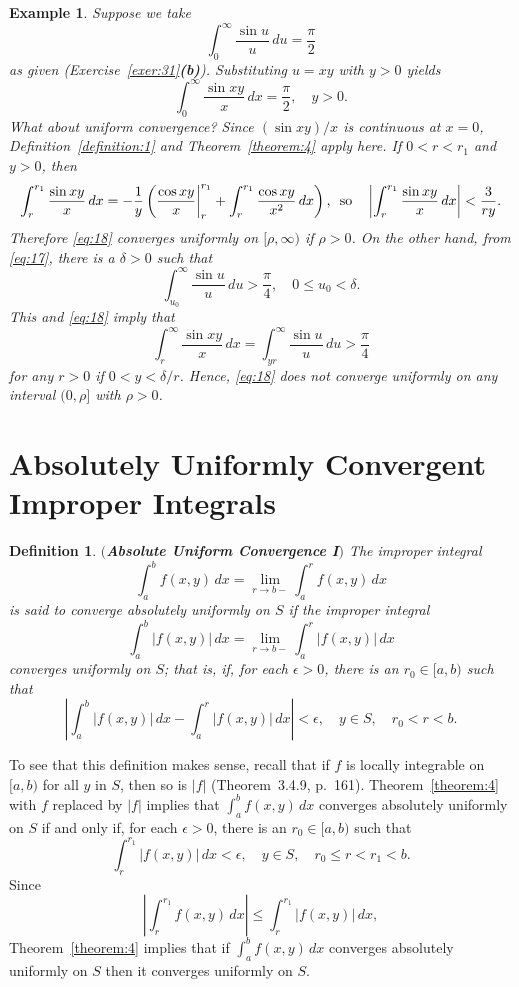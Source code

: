 \documentclass{article}
\newtheorem{definition}{Definition}
\newtheorem{example}{Example}
\begin{document}
\begin{example}  \label{example:6}  \rm
Suppose we take
\begin{equation} \label{eq:17}
\int_{0}^{\infty}\frac{\sin u}{u}\,du =\frac{\pi}{2}
\end{equation}
as given (Exercise~\ref{exer:31}{\bf(b)}).  Substituting $u=xy$ with $y>0$
yields
\begin{equation} \label{eq:18}
\int_{0}^{\infty}\frac{\sin xy}{x}\,dx=\frac{\pi}{2},\quad y>0.
\end{equation}
What about uniform convergence?
Since $(\sin xy)/x$ is continuous at $x=0$, Definition~\ref{definition:1}
and Theorem~\ref{theorem:4} apply here.
If $0<r<r_{1}$ and $y>0$, then
$$
\int_{r}^{r_{1}}\frac{\sin xy}{x}\,dx=-\frac{1}{y}
\left(\frac{\cos xy}{x}\biggr|_{r}^{r_{1}}+
\int_{r}^{r_{1}}\frac{\cos xy}{x^{2}}\,dx\right),
\text{\, so\quad}
\left|\int_{r}^{r_{1}}\frac{\sin xy}{x}\,dx\right|<\frac{3}{ry}.
$$
Therefore \eqref{eq:18} converges uniformly on
$[\rho,\infty)$ if $\rho>0$. On the other hand, from \eqref{eq:17},
there is a $\delta>0$  such that
$$
\int_{u_{0}}^{\infty}\frac{\sin u}{u}\,du>\frac{\pi}{4}, \quad
0 \le u_{0}<\delta.
$$
This and \eqref{eq:18} imply that
$$
\int_{r}^{\infty}\frac{\sin xy}{x}\,dx=\int_{yr}^{\infty}\frac{\sin
u}{u}\,du
>\frac{\pi}{4}
$$
for any $r>0$ if   $0 <y<\delta/r$. Hence, \eqref{eq:18}
does not converge uniformly  on any interval $(0,\rho]$  with $\rho>0$.
\end{example}

\section{ Absolutely Uniformly Convergent Improper
Integrals}\label{section:absolutely}

\begin{definition}{\bf$($Absolute Uniform Convergence I$)$}
\label{definition:4}
The improper integral
$$
\int_{a}^{b}f(x,y)\,dx=\lim_{r\to b-}\int_{a}^{r}f(x,y)\,dx
$$
is said to converge absolutely  uniformly on $S$ if the improper
integral
$$
\int_{a}^{b}|f(x,y)|\,dx=\lim_{r\to b-}\int_{a}^{r}|f(x,y)|\,dx
$$
converges uniformly on $S$; that is,
 if, for each $\epsilon>0$,
there is an $r_{0}\in [a,b)$  such that
$$
\left|\int_{a}^{b}|f(x,y)|\,dx-\int_{a}^{r}|f(x,y)|\,dx\right|
<\epsilon, \quad y\in S,\quad
 r_{0}<r<b.
$$
\end{definition}

To see that this definition makes sense, recall that if $f$ is
locally integrable on $[a,b)$ for all $y$ in $S$, then so is $|f|$
(Theorem~3.4.9, p.~161).
Theorem~\ref{theorem:4}  with $f$  replaced by $|f|$ implies that
$\int_{a}^{b}f(x,y)\,dx$ converges absolutely uniformly  on
$S$ if and only if, for each
$\epsilon>0$, there is an $r_{0}\in [a,b)$  such that
$$
\int_{r}^{r_{1}}|f(x,y)|\,dx<\epsilon,\quad  y\in S,\quad
r_{0}\le r<r_{1}<b .
$$
Since
$$
\left|\int_{r}^{r_{1}}f(x,y)\,dx\right| \le
\int_{r}^{r_{1}}|f(x,y)|\,dx,
$$
Theorem~\ref{theorem:4} implies that if $\int_{a}^{b}f(x,y)\,dx$
 converges absolutely uniformly on  $S$ then it converges
 uniformly   on $S$.
\end{document}
